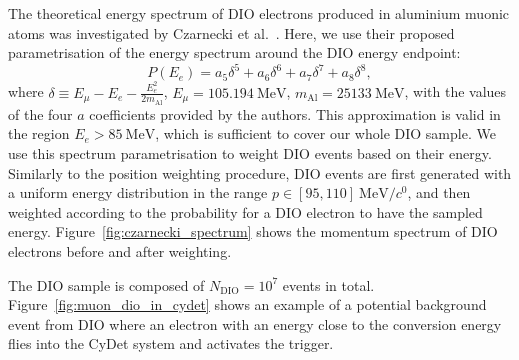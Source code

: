The theoretical energy spectrum of DIO electrons produced in aluminium muonic
atoms was investigated by Czarnecki et al.~\cite{czarnecki}. Here, we use their
proposed parametrisation of the energy spectrum around the DIO energy endpoint:
\begin{equation}\label{eq:czarnecki_param}
P(E_e) = a_5 \delta^5 + a_6 \delta^6 + a_7 \delta^7 + a_8 \delta^8,
\end{equation}
where $\delta \equiv E_\mu  - E_e - \frac{E_e^2}{2 m_\mathrm{Al}}$, $E_\mu =
\SI{105.194}{\MeV}$, $m_\mathrm{Al} = \SI{25133}{\MeV}$, with the values of the
four $a$ coefficients provided by the authors. This approximation is valid in
the region $E_e > \SI{85}{\MeV}$, which is sufficient to cover our whole DIO
sample. We use this spectrum parametrisation to weight DIO events based on their
energy. Similarly to the position weighting procedure, DIO events are first
generated with a uniform energy distribution in the range $p \in [95,
110]~\si{\MeV/\clight}$, and then weighted according to the probability for a
DIO electron to have the sampled energy. Figure~\ref{fig:czarnecki_spectrum}
shows the momentum spectrum of DIO electrons before and after weighting.

The DIO sample is composed of $N_\mathrm{DIO} = 10^7$ events in total.
Figure~\ref{fig:muon_dio_in_cydet} shows an example of a potential background
event from DIO where an electron with an energy close to the conversion energy
flies into the CyDet system and activates the trigger.

